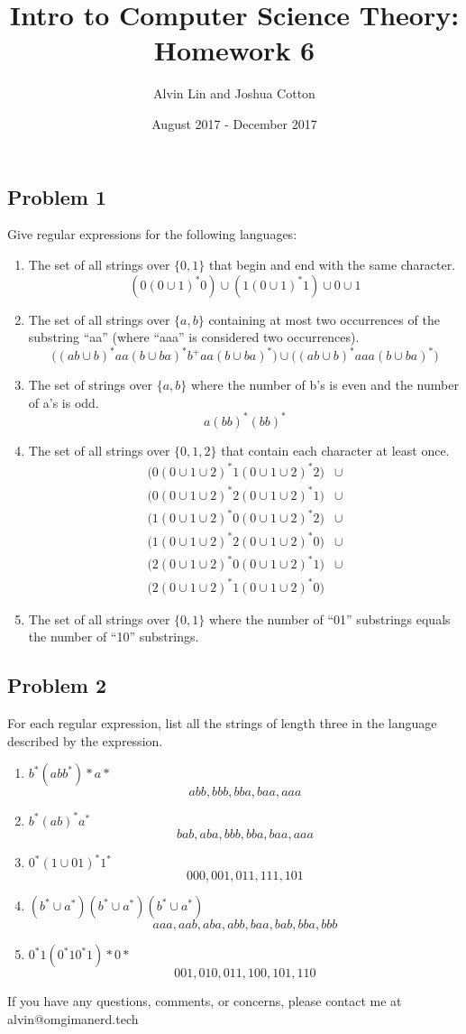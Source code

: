 \documentclass{math}
\title{Intro to Computer Science Theory: Homework 6}
\author{Alvin Lin and Joshua Cotton}
\date{August 2017 - December 2017}
\begin{document}
\maketitle

\subsection*{Problem 1}
Give regular expressions for the following languages:
\begin{enumerate}
  \item The set of all strings over \( \{0,1\} \) that begin and end with the
  same character.
  \[ (0(0\cup1)^*0)\cup(1(0\cup1)^*1)\cup0\cup1 \]
  \item The set of all strings over \( \{a,b\} \) containing at most two
  occurrences of the substring ``aa'' (where ``aaa'' is considered two
  occurrences).
  \[ \bigg((ab\cup b)^*aa(b\cup ba)^*b^+aa(b\cup ba)^*\bigg)\cup
    \bigg((ab\cup b)^*aaa(b\cup ba)^*\bigg) \]
  \item The set of strings over \( \{a,b\} \) where the number of b's is even
  and the number of a's is odd.
  \[ a(bb)^*(bb)^* \]
  \item The set of all strings over \( \{0,1,2\} \) that contain each character
  at least once.
  \begin{align*}
    \bigg(0(0\cup1\cup2)^*1(0\cup1\cup2)^*2\bigg) &\cup \\
    \bigg(0(0\cup1\cup2)^*2(0\cup1\cup2)^*1\bigg) &\cup \\
    \bigg(1(0\cup1\cup2)^*0(0\cup1\cup2)^*2\bigg) &\cup \\
    \bigg(1(0\cup1\cup2)^*2(0\cup1\cup2)^*0\bigg) &\cup \\
    \bigg(2(0\cup1\cup2)^*0(0\cup1\cup2)^*1\bigg) &\cup \\
    \bigg(2(0\cup1\cup2)^*1(0\cup1\cup2)^*0\bigg)
  \end{align*}
  \item The set of all strings over \( \{0,1\} \) where the number of ``01''
  substrings equals the number of ``10'' substrings.
\end{enumerate}

\subsection*{Problem 2}
For each regular expression, list all the strings of length three in the
language described by the expression.
\begin{enumerate}
  \item \( b^*(abb^*)*a* \)
  \[ abb, bbb, bba, baa, aaa \]
  \item \( b^*(ab)^*a^* \)
  \[ bab, aba, bbb, bba, baa, aaa \]
  \item \( 0^*(1\cup01)^*1^* \)
  \[ 000, 001, 011, 111, 101 \]
  \item \( (b^*\cup a^*)(b^*\cup a^*)(b^*\cup a^*) \)
  \[ aaa, aab, aba, abb, baa, bab, bba, bbb \]
  \item \( 0^*1(0^*10^*1)*0* \)
  \[ 001, 010, 011, 100, 101, 110 \]
\end{enumerate}

\begin{center}
  If you have any questions, comments, or concerns, please contact me at
  alvin@omgimanerd.tech
\end{center}
\end{document}
